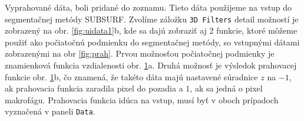 \documentclass[a4paper,11pt,oneside]{article}%
\begin{document}
Vyprahované dáta, boli pridané do zoznamu. Tieto dáta použijeme na vstup do segmentačnej metódy SUBSURF. Zvolíme záložku \texttt{3D Filters} detail možností je zobrazený na obr. \ref{fig:uidata1}b, kde sa dajú zobraziť aj 2 funkcie, ktoré môžeme použiť ako počiatočnú podmienku do segmentačnej metódy, so vstupnými dátami zobrazenými na obr \ref{fig:prah}. Prvou možnosťou počiatočnej podmienky  je znamienková funkcia vzdialenosti obr. \ref{fig:pp}a. Druhá možnosť je výsledok prahovacej funkcie  obr. \ref{fig:pp}b, čo znamená, že takéto dáta majú nastavené súradnice $z$ na $-1$, ak prahovacia funkcia zaradila pixel do pozadia a $1$, ak sa jedná o pixel makrofágu. Prahovacia funkcia idúca na vstup, musí byť v oboch prípadoch vyznačená v paneli \texttt{Data}.

\begin{figure}[H]%
    \centering
    \qquad
    \caption{}%
    \label{fig:pp}%
\end{figure}
\end{document}
